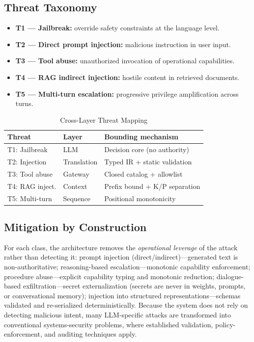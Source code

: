 \documentclass[conference]{IEEEtran}
\begin{document}
\subsection{Threat Taxonomy}
\begin{itemize}
\item \textbf{T1 --- Jailbreak:} override safety constraints at the
language level.
\item \textbf{T2 --- Direct prompt injection:} malicious instruction in
user input.
\item \textbf{T3 --- Tool abuse:} unauthorized invocation of operational
capabilities.
\item \textbf{T4 --- RAG indirect injection:} hostile content in retrieved
documents.
\item \textbf{T5 --- Multi-turn escalation:} progressive privilege
amplification across turns.
\end{itemize}

\begin{table}[t]
\caption{Cross-Layer Threat Mapping}
\label{tab:threat}
\centering
\begin{tabular}{lll}
\toprule
\textbf{Threat} & \textbf{Layer} & \textbf{Bounding mechanism}\\
\midrule
T1: Jailbreak    & LLM         & Decision core (no authority)\\
T2: Injection    & Translation & Typed IR + static validation\\
T3: Tool abuse   & Gateway     & Closed catalog + allowlist\\
T4: RAG inject.  & Context     & Prefix bound + K/P separation\\
T5: Multi-turn   & Sequence    & Positional monotonicity\\
\bottomrule
\end{tabular}
\end{table}

\subsection{Mitigation by Construction}
For each class, the architecture removes the \emph{operational leverage}
of the attack rather than detecting it: prompt injection
(direct/indirect)---generated text is non-authoritative; reasoning-based
escalation---monotonic capability enforcement; procedure
abuse---explicit capability typing and monotonic reduction;
dialogue-based exfiltration---secret externalization (secrets are never in
weights, prompts, or conversational memory); injection into structured
representations---schemas validated and re-serialized deterministically.
Because the system does not rely on detecting malicious intent, many
LLM-specific attacks are transformed into conventional systems-security
problems, where established validation, policy-enforcement, and auditing
techniques apply.
\end{document}
